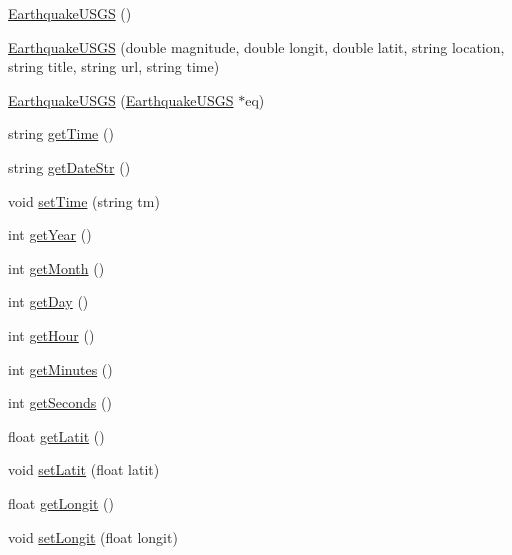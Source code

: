 \begin{DoxyCompactItemize}
\item 
\hyperlink{classbridges_1_1_earthquake_u_s_g_s_a540ae74c248da179fbbd182b843a14e0}{Earthquake\+U\+S\+G\+S} ()
\item 
\hyperlink{classbridges_1_1_earthquake_u_s_g_s_a9c7f7aec2ddc173660a7015b90c7b7b0}{Earthquake\+U\+S\+G\+S} (double magnitude, double longit, double latit, string location, string title, string url, string time)
\item 
\hyperlink{classbridges_1_1_earthquake_u_s_g_s_aa52d05b3119c6a4e45867dc4aaeba59e}{Earthquake\+U\+S\+G\+S} (\hyperlink{classbridges_1_1_earthquake_u_s_g_s}{Earthquake\+U\+S\+G\+S} $\ast$eq)
\item 
string \hyperlink{classbridges_1_1_earthquake_u_s_g_s_a8d142b4ea194c5d839015ee7850a12c6}{get\+Time} ()
\item 
string \hyperlink{classbridges_1_1_earthquake_u_s_g_s_a4d3be95771696b632e25f7e296884985}{get\+Date\+Str} ()
\item 
void \hyperlink{classbridges_1_1_earthquake_u_s_g_s_a70d79cd5c3666b8a32b1d45d7364054b}{set\+Time} (string tm)
\item 
int \hyperlink{classbridges_1_1_earthquake_u_s_g_s_ae833038db474d72c6d76b3efe6b4a8fa}{get\+Year} ()
\item 
int \hyperlink{classbridges_1_1_earthquake_u_s_g_s_ad254b6e777b631f2597ef8c550da944c}{get\+Month} ()
\item 
int \hyperlink{classbridges_1_1_earthquake_u_s_g_s_a4513be14d482242f57dd04ded0691fc2}{get\+Day} ()
\item 
int \hyperlink{classbridges_1_1_earthquake_u_s_g_s_a831e45a3b46e49fa4e0c2beeafbec7d1}{get\+Hour} ()
\item 
int \hyperlink{classbridges_1_1_earthquake_u_s_g_s_af32892b6f94893ff02985a9721e1e5b2}{get\+Minutes} ()
\item 
int \hyperlink{classbridges_1_1_earthquake_u_s_g_s_a65a4a0cbf8916a2c3a5a49ce8d28d15a}{get\+Seconds} ()
\item 
float \hyperlink{classbridges_1_1_earthquake_u_s_g_s_abbae7f51eb9905e8ddada88d6127bf98}{get\+Latit} ()
\item 
void \hyperlink{classbridges_1_1_earthquake_u_s_g_s_a143678bb9dd697f82dcb260ddab78f82}{set\+Latit} (float latit)
\item 
float \hyperlink{classbridges_1_1_earthquake_u_s_g_s_a63c2fed8b27dace2b988dd9c0c937d70}{get\+Longit} ()
\item 
void \hyperlink{classbridges_1_1_earthquake_u_s_g_s_a745dc27f3c68a3ae996ceb7771d89ec5}{set\+Longit} (float longit)

\end{DoxyCompactItemize}
